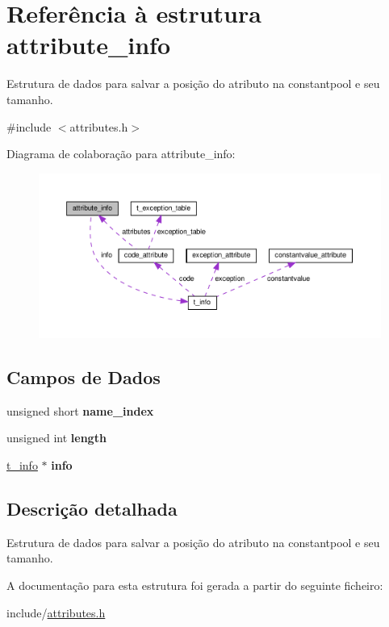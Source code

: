 \hypertarget{structattribute__info}{}\section{Referência à estrutura attribute\+\_\+info}
\label{structattribute__info}


Estrutura de dados para salvar a posição do atributo na constantpool e seu tamanho.  




{\ttfamily \#include $<$attributes.\+h$>$}



Diagrama de colaboração para attribute\+\_\+info\+:\nopagebreak
\begin{figure}[H]
\begin{center}
\leavevmode
\includegraphics[width=350pt]{structattribute__info__coll__graph}
\end{center}
\end{figure}
\subsection*{Campos de Dados}
\begin{DoxyCompactItemize}
\item 
\mbox{\label{structattribute__info_ac90a7f38d57c03dd9b213a4191fdfe0f}} 
unsigned short {\bfseries name\+\_\+index}
\item 
\mbox{\label{structattribute__info_aa2b93ad2b4c621ba81208b0985cd3366}} 
unsigned int {\bfseries length}
\item 
\mbox{\label{structattribute__info_af3007a2d07cad3057fc835fdc7b2b774}} 
\hyperlink{uniont__info}{t\+\_\+info} $\ast$ {\bfseries info}
\end{DoxyCompactItemize}


\subsection{Descrição detalhada}
Estrutura de dados para salvar a posição do atributo na constantpool e seu tamanho. 

A documentação para esta estrutura foi gerada a partir do seguinte ficheiro\+:\begin{DoxyCompactItemize}
\item 
include/\hyperlink{attributes_8h}{attributes.\+h}\end{DoxyCompactItemize}

